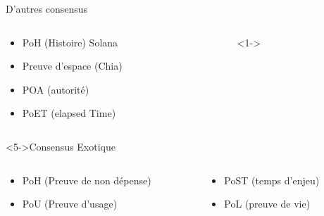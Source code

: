 \documentclass[presentation]{beamer}
\begin{document}
\begin{frame}[label={sec:orgd9ae9f7}]{D'autres consensus}
\begin{columns}
\begin{column}{0.4\columnwidth}
\begin{block}{}
\begin{itemize}
\item <1-> PoH (Histoire) Solana
\item <2-> Preuve d'espace (Chia)
\item <3-> POA (autorité)
\end{itemize}

\begin{itemize}
\item <4-> PoET (elapsed Time)
\end{itemize}
\end{block}
\end{column}

\begin{column}{0.6\columnwidth}
\begin{block}<1->{}
\end{block}
\end{column}
\end{columns}

\begin{block}<5->{Consensus Exotique}
\begin{columns}
\begin{column}{0.5\columnwidth}
\begin{block}{}
\begin{itemize}
\item PoH (Preuve de non dépense)
\item PoU (Preuve d'usage)
\end{itemize}
\end{block}
\end{column}
\begin{column}{0.5\columnwidth}
\begin{block}{}
\begin{itemize}
\item PoST (temps d'enjeu)
\item PoL (preuve de vie)
\end{itemize}
\end{block}
\end{column}
\end{columns}
\end{block}
\end{frame}
\end{document}
